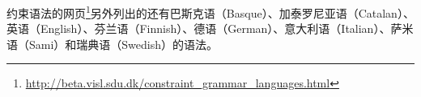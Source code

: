 \begin{itemize}
\end{itemize}
约束语法的网页\footnote{%
  \url{http://beta.visl.sdu.dk/constraint_grammar_languages.html}
}另外列出的还有巴斯克语（Basque）、加泰罗尼亚语（Catalan）、英语（English）、芬兰语（Finnish）、德语（German）、意大利语（Italian）、萨米语（Sami）和瑞典语（Swedish）的语法。
%

